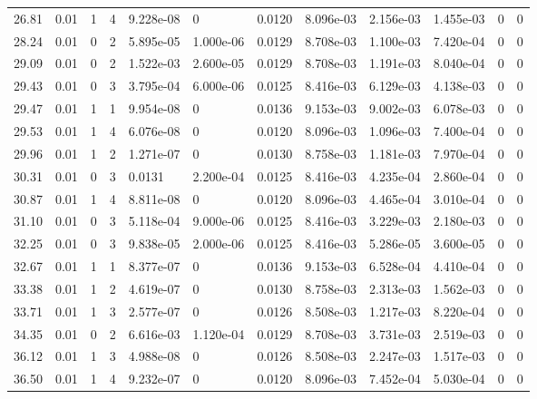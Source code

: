 \documentclass[preview]{standalone}
\begin{document}
{{{\begin{tabular}{L{1.2cm}C{1.2cm} C{0.3cm}C{0.5cm} C{1.4cm}C{1.4cm} C{1.4cm}C{1.4cm} C{1.6cm}C{1.6cm} C{1.6cm}C{1.6cm}}
  26.81  &  0.01  & 1     &  4 &  9.228e-08  & 0  &  0.0120&   8.096e-03& 2.156e-03 & 1.455e-03   &  0 & 0  \\ 
  28.24  &  0.01  & 0     &  2 &  5.895e-05  & 1.000e-06  &  0.0129&   8.708e-03& 1.100e-03 & 7.420e-04   &  0 & 0  \\ 
  29.09  &  0.01  & 0     &  2 &  1.522e-03  & 2.600e-05  &  0.0129&   8.708e-03& 1.191e-03 & 8.040e-04   &  0 & 0  \\ 
  29.43  &  0.01  & 0     &  3 &  3.795e-04  & 6.000e-06  &  0.0125&   8.416e-03& 6.129e-03 & 4.138e-03   &  0 & 0  \\ 
  29.47  &  0.01  & 1     &  1 &  9.954e-08  & 0  &  0.0136&   9.153e-03& 9.002e-03 & 6.078e-03   &  0 & 0  \\ 
  29.53  &  0.01  & 1     &  4 &  6.076e-08  & 0  &  0.0120&   8.096e-03& 1.096e-03 & 7.400e-04   &  0 & 0  \\ 
  29.96  &  0.01  & 1     &  2 &  1.271e-07  & 0  &  0.0130&   8.758e-03& 1.181e-03 & 7.970e-04   &  0 & 0  \\ 
  30.31  &  0.01  & 0     &  3 &  0.0131  & 2.200e-04  &  0.0125&   8.416e-03& 4.235e-04 & 2.860e-04   &  0 & 0  \\ 
  30.87  &  0.01  & 1     &  4 &  8.811e-08  & 0  &  0.0120&   8.096e-03& 4.465e-04 & 3.010e-04   &  0 & 0  \\ 
  31.10  &  0.01  & 0     &  3 &  5.118e-04  & 9.000e-06  &  0.0125&   8.416e-03& 3.229e-03 & 2.180e-03   &  0 & 0  \\ 
  32.25  &  0.01  & 0     &  3 &  9.838e-05  & 2.000e-06  &  0.0125&   8.416e-03& 5.286e-05 & 3.600e-05   &  0 & 0  \\ 
  32.67  &  0.01  & 1     &  1 &  8.377e-07  & 0  &  0.0136&   9.153e-03& 6.528e-04 & 4.410e-04   &  0 & 0  \\ 
  33.38  &  0.01  & 1     &  2 &  4.619e-07  & 0  &  0.0130&   8.758e-03& 2.313e-03 & 1.562e-03   &  0 & 0  \\ 
  33.71  &  0.01  & 1     &  3 &  2.577e-07  & 0  &  0.0126&   8.508e-03& 1.217e-03 & 8.220e-04   &  0 & 0  \\ 
  34.35  &  0.01  & 0     &  2 &  6.616e-03  & 1.120e-04  &  0.0129&   8.708e-03& 3.731e-03 & 2.519e-03   &  0 & 0  \\ 
  36.12  &  0.01  & 1     &  3 &  4.988e-08  & 0  &  0.0126&   8.508e-03& 2.247e-03 & 1.517e-03   &  0 & 0  \\ 
  36.50  &  0.01  & 1     &  4 &  9.232e-07  & 0  &  0.0120&   8.096e-03& 7.452e-04 & 5.030e-04   &  0 & 0  \\ 

\end{tabular}}}}
\end{document}
